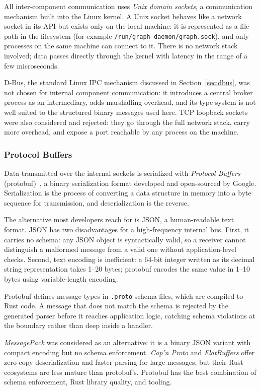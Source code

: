 All inter-component communication uses \emph{Unix domain sockets}, a
communication mechanism built into the Linux kernel. A Unix socket behaves
like a network socket in its API but exists only on the local machine: it is
represented as a file path in the filesystem (for example
\texttt{/run/graph-daemon/graph.sock}), and only processes on the same machine
can connect to it. There is no network stack involved; data passes directly
through the kernel with latency in the range of a few microseconds.

D-Bus, the standard Linux IPC mechanism discussed in
Section~\ref{sec:dbus}, was not chosen for internal component communication:
it introduces a central broker process as an intermediary, adds marshalling
overhead, and its type system is not well suited to the structured binary
messages used here. TCP loopback sockets were also considered and rejected: they
go through the full network stack, carry more overhead, and expose a port
reachable by any process on the machine.

\subsubsection{Protocol Buffers}
\label{sec:protobuf}

Data transmitted over the internal sockets is serialized with \emph{Protocol
Buffers} (protobuf)~\cite{protobuf}, a binary serialization format developed and open-sourced by
Google. Serialization is the process of converting a data structure in memory
into a byte sequence for transmission, and deserialization is the reverse.

The alternative most developers reach for is JSON, a human-readable text format.
JSON has two disadvantages for a high-frequency internal bus. First, it carries
no schema: any JSON object is syntactically valid, so a receiver cannot
distinguish a malformed message from a valid one without application-level
checks. Second, text encoding is inefficient: a 64-bit integer written as its
decimal string representation takes 1--20 bytes; protobuf encodes the same value
in 1--10 bytes using variable-length encoding.

Protobuf defines message types in \texttt{.proto} schema files, which are
compiled to Rust code. A message that does not match the schema is rejected by
the generated parser before it reaches application logic, catching schema
violations at the boundary rather than deep inside a handler.

\emph{MessagePack} was considered as an alternative: it is a binary JSON
variant with compact encoding but no schema enforcement. \emph{Cap'n Proto} and
\emph{FlatBuffers} offer zero-copy deserialization and faster parsing for large
messages, but their Rust ecosystems are less mature than protobuf's. Protobuf
has the best combination of schema enforcement, Rust library quality, and
tooling.

